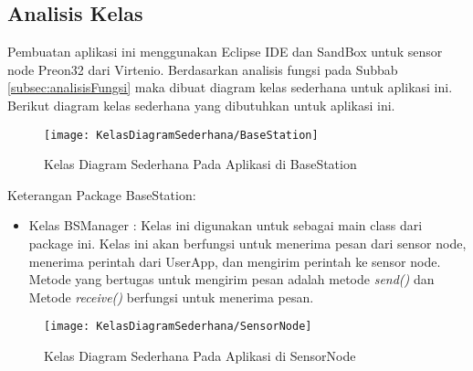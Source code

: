 \newpage
\subsection{Analisis Kelas}
\label{subsec:analisisKelas}
Pembuatan aplikasi ini menggunakan Eclipse IDE dan SandBox untuk sensor node Preon32 dari Virtenio. Berdasarkan analisis fungsi pada Subbab \ref{subsec:analisisFungsi} maka dibuat diagram kelas sederhana untuk aplikasi ini.
 Berikut diagram kelas sederhana yang dibutuhkan untuk aplikasi ini.

\begin{figure} [H]
	\centering  
	\texttt{[image: KelasDiagramSederhana/BaseStation]}  
	\caption[Kelas Diagram Sederhana Pada Aplikasi di BaseStation]{Kelas Diagram Sederhana Pada Aplikasi di BaseStation} 
	\label{fig:BaseStation} 
\end{figure} 

Keterangan Package BaseStation:
\begin{itemize}
	\item Kelas BSManager : Kelas ini digunakan untuk sebagai main class dari package ini. Kelas ini akan berfungsi untuk menerima pesan dari sensor node, menerima perintah dari UserApp, dan mengirim perintah ke sensor node. Metode yang bertugas untuk mengirim pesan adalah metode {\it send()} dan Metode {\it receive()} berfungsi untuk menerima pesan.
\end{itemize}

\begin{figure} [H]
	\centering  
	\texttt{[image: KelasDiagramSederhana/SensorNode]}  
	\caption[Kelas Diagram Sederhana Pada Aplikasi di SensorNode]{Kelas Diagram Sederhana Pada Aplikasi di SensorNode} 
	\label{fig:SensorNode} 
\end{figure} 

